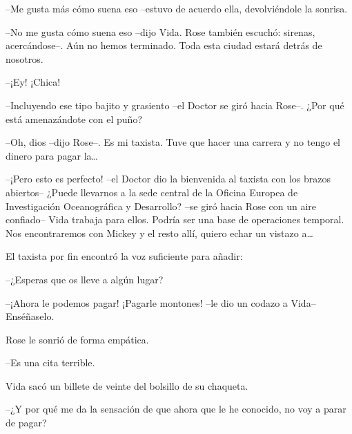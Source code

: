 {--Me gusta más cómo suena eso --estuvo de acuerdo ella, devolviéndole
la sonrisa.}

{--No me gusta cómo suena eso --dijo Vida. Rose también escuchó:
 sirenas, acercándose--. Aún no hemos terminado. Toda esta ciudad estará
detrás de nosotros.}

{--¡Ey! ¡Chica!}

{--Incluyendo ese tipo bajito y grasiento --el Doctor se giró hacia
Rose--. ¿Por qué está amenazándote con el puño?}

{--Oh, dios --dijo Rose--. Es mi taxista. Tuve que hacer una carrera y
 no tengo el dinero para pagar la\ldots{}}

{--¡Pero esto es perfecto! --el Doctor dio la bienvenida al taxista con
 los brazos abiertos-- ¿Puede llevarnos a la sede central de la Oficina
 Europea de Investigación Oceanográfica y Desarrollo? --se giró hacia
 Rose con un aire confiado-- Vida trabaja para ellos. Podría ser una base
 de operaciones temporal. Nos encontraremos con Mickey y el resto allí,
 quiero echar un vistazo a\ldots{}}

{El taxista por fin encontró la voz suficiente para añadir:}

{--¿Esperas que os lleve a algún lugar?}

{--¡Ahora le podemos pagar! ¡Pagarle montones! --le dio un codazo a
Vida-- Enséñaselo.}

{Rose le sonrió de forma empática.}

{--Es una cita terrible.}

{Vida sacó un billete de veinte del bolsillo de su chaqueta.}

{--¿Y por qué me da la sensación de que ahora que le he conocido, no voy
a parar de pagar?}
